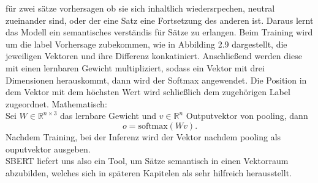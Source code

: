 \documentclass[12pt,letterpaper,ngerman]{article}
\begin{document}
für zwei sätze vorhersagen ob sie sich inhaltlich wiedersrpechen, neutral
zueinander sind, oder der eine Satz eine Fortsetzung des anderen ist. Daraus
lernt das Modell ein semantisches verständis für Sätze zu erlangen. Beim Training
wird um die label Vorhersage zubekommen, wie in Abbilding 2.9 dargestellt,
die jeweiligen Vektoren und ihre Differenz konkatiniert. Anschließend werden
diese mit einen lernbaren Gewicht multipliziert, sodass ein Vektor mit 
drei Dimensionen herauskommt, dann wird der Softmax angewendet.
Die Position in dem Vektor mit dem höchsten Wert wird schließlich dem zugehörigen
Label zugeordnet. Mathematisch: \\Sei $W \in \mathbb{R}^{n\times 3}$
das lernbare Gewicht und $v \in \mathbb{R}^n$ Outputvektor von pooling, dann
\[
  o = \text{softmax}(Wv).
\]
Nachdem Training, bei der Inferenz wird der Vektor nachdem pooling als 
ouputvektor ausgeben.\\
SBERT liefert uns also ein Tool, um Sätze semantisch in einen Vektorraum
abzubilden, welches sich in späteren Kapitelen als sehr hilfreich herausstellt.
\end{document}
